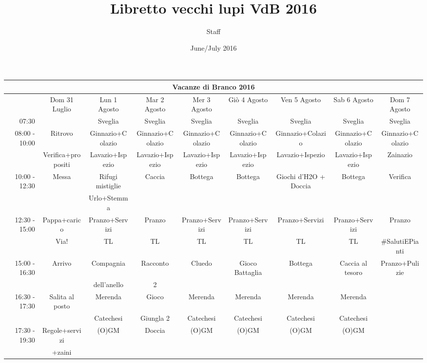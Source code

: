 \documentclass[a4paper]{article}
\title{Libretto vecchi lupi VdB 2016}
\author{Staff}
\date{June/July 2016}
\begin{document}
\maketitle

\begin{landscape}
\begin{adjustwidth}{-2.5cm}{-1cm}%
 \begin{tabular}{|r|c|c|c|c|c|c|c|c|}
 \hline
 \multicolumn{9}{|c|}{Vacanze di Branco 2016}\\
 \hline
        &Dom 31 Luglio&Lun 1 Agosto&Mar 2 Agosto&Mer 3 Agosto&Giò 4 Agosto&Ven 5 Agosto&Sab 6 Agosto&Dom 7 Agosto\\ \hline
        07:30& &Sveglia&Sveglia&Sveglia&Sveglia&Sveglia&Sveglia&Sveglia\\ \hline
        
        \multirow{2}{*}{08:00 - 10:00}&Ritrovo&Ginnazio+Colazio&Ginnazio+Colazio&Ginnazio+Colazio&Ginnazio+Colazio&Ginnazio+Colazio&Ginnazio+Colazio&Ginnazio+Colazio\\
        &Verifica+propositi&Lavazio+Ispezio&Lavazio+Ispezio&Lavazio+Ispezio&Lavazio+Ispezio&Lavazio+Ispezio&Lavazio+Ispezio&Zainazio\\ \hline
        
        \multirow{2}{*}{10:00 - 12:30}&Messa&Rifugi mistiglie&Caccia&Bottega&Bottega&Giochi d'H2O + Doccia&Bottega&Verifica\\
        & &Urlo+Stemma& & & & & &\\ \hline
        
        \multirow{2}{*}{12:30 - 15:00}&Pappa+carico&Pranzo+Servizi&Pranzo&Pranzo+Servizi&Pranzo+Servizi&Pranzo+Servizi&Pranzo+Servizi&Pranzo\\&Via!&TL&TL&TL&TL&TL&TL&\#SalutiEPianti\\ \hline
    
        \multirow{2}{*}{15:00 - 16:30}&Arrivo&Compagnia&Racconto&Cluedo&Gioco Battaglia&Bottega&Caccia al tesoro&Pranzo+Pulizie\\& &dell'anello&2& & & & &\\ \hline
        
    
        \multirow{2}{*}{16:30 - 17:30}&Salita al posto&Merenda&Gioco&Merenda&Merenda&Merenda&Merenda&\\& &Catechesi&Giungla 2&Catechesi&Catechesi&Catechesi&Catechesi&\\ \hline
        \multirow{2}{*}{17:30 - 19:30}&Regole+servizi&(O)GM&Doccia&(O)GM&(O)GM&(O)GM&(O)GM&\\&+zaini& & & & & & &\\ \hline
        

\end{tabular}
\end{adjustwidth}
\end{landscape}
\end{document}
